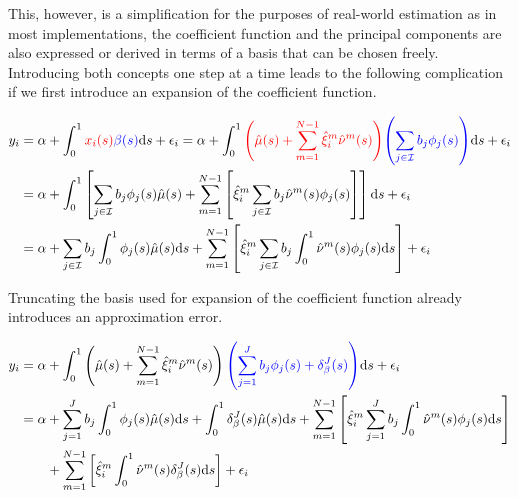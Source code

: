 \documentclass[11pt,twoside,a4paper]{article}
\begin{document}
	This, however, is a simplification for the purposes of real-world estimation as in most implementations, the coefficient function and the principal components are also expressed or derived in terms of a basis that can be chosen freely. Introducing both concepts one step at a time leads to the following complication if we first introduce an expansion of the coefficient function.

	\begin{equation}
		\begin{split}
			y_i &= \alpha + \int_{0}^{1} {\color{red}x_i(s)} {\color{blue}\beta(s)} \mathrm{d}s + \epsilon_i
			= \alpha + \int_{0}^{1} {\color{red}\left(\hat{\mu}(s) + \sum_{m = 1}^{N-1} \hat{\xi}^{m}_i \hat{\nu}^{m}(s)\right)} {\color{blue}\left(\sum_{j \in \mathcal{I}} b_j \phi_j(s)\right)} \mathrm{d}s + \epsilon_i\\
			&= \alpha + \int_{0}^{1} \left[ \sum_{j \in \mathcal{I}} b_j \phi_j(s) \hat{\mu}(s) + \sum_{m = 1}^{N-1} \left[ \hat{\xi}^m_i \sum_{j \in \mathcal{I}} b_j \hat{\nu}^m(s) \phi_j(s) \right] \right] \mathrm{d}s + \epsilon_i \\
			&= \alpha + \sum_{j \in \mathcal{I}} b_j \int_{0}^{1} \phi_j(s) \hat{\mu}(s) \mathrm{d}s + \sum_{m = 1}^{N-1} \left[ \hat{\xi}^m_i \sum_{j \in \mathcal{I}} b_j \int_{0}^{1}\hat{\nu}^m(s) \phi_j(s) \mathrm{d}s \right] + \epsilon_i
		\end{split}
	\end{equation}

	Truncating the basis used for expansion of the coefficient function already introduces an approximation error.
	
	\begin{equation}\label{fpcr_reg_both_expansions}
		\begin{split}
			y_i &= \alpha + \int_{0}^{1} \left(\hat{\mu}(s) + \sum_{m = 1}^{N-1} \hat{\xi}^{m}_i \hat{\nu}^{m}(s)\right) {\color{blue}\left(\sum_{j = 1}^{J} b_j \phi_j(s) + \delta_{\beta}^{J}(s)\right)} \mathrm{d}s + \epsilon_i\\
			&= \alpha + \sum_{j = 1}^{J} b_j \int_{0}^{1} \phi_j(s) \hat{\mu}(s) \mathrm{d}s + \int_{0}^{1} \delta_{\beta}^{J}(s) \hat{\mu}(s) \mathrm{d}s + \sum_{m = 1}^{N-1} \left[ \hat{\xi}^m_i \sum_{j = 1}^{J} b_j \int_{0}^{1}\hat{\nu}^m(s) \phi_j(s) \mathrm{d}s \right] \\
			& \quad \quad + \sum_{m = 1}^{N-1} \left[ \hat{\xi}^m_i \int_{0}^{1}\hat{\nu}^m(s) \delta_{\beta}^{J}(s) \mathrm{d}s \right] + \epsilon_i
		\end{split}
	\end{equation}
\end{document}
